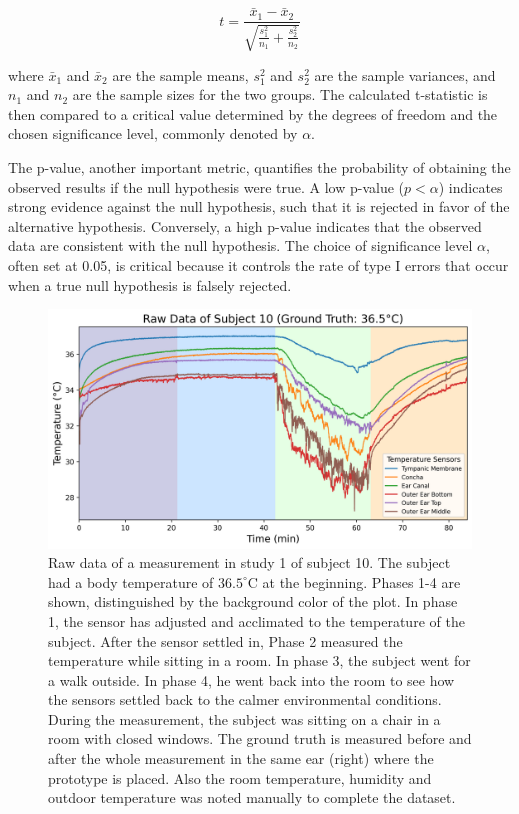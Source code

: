 \[
t = \frac{{\bar{x}_1 - \bar{x}_2}}{\sqrt{\frac{{s_1^2}}{n_1} + \frac{{s_2^2}}{n_2}}}
\]

where \( \bar{x}_1 \) and \( \bar{x}_2 \) are the sample means, \( s_1^2 \) and \( s_2^2 \) are the sample variances, and \( n_1 \) and \( n_2 \) are the sample sizes for the two groups.
The calculated t-statistic is then compared to a critical value determined by the degrees of freedom and the chosen significance level, commonly denoted by \( \alpha \).

The p-value, another important metric, quantifies the probability of obtaining the observed results if the null hypothesis were true.
A low p-value (\( p < \alpha \)) indicates strong evidence against the null hypothesis, such that it is rejected in favor of the alternative hypothesis.
Conversely, a high p-value indicates that the observed data are consistent with the null hypothesis.
The choice of significance level \( \alpha \), often set at 0.05, is critical because it controls the rate of type I errors that occur when a true null hypothesis is falsely rejected.

\begin{figure}[!t]
    \centering
    \includegraphics[width=\textwidth]{thesis-doc/images/study1/Logging_person_10_0smoothed_raw_data.png}
    \caption{Raw data of a measurement in study 1 of subject 10. The subject had a body temperature of $36.5^\circ\text{C}$ at the beginning. Phases 1-4 are shown, distinguished by the background color of the plot. In phase 1, the sensor has adjusted and acclimated to the temperature of the subject. After the sensor settled in, Phase 2 measured the temperature while sitting in a room. In phase 3, the subject went for a walk outside. In phase 4, he went back into the room to see how the sensors settled back to the calmer environmental conditions. During the measurement, the subject was sitting on a chair in a room with closed windows. The ground truth is measured before and after the whole measurement in the same ear (right) where the prototype is placed. Also the room temperature, humidity and outdoor temperature was noted manually to complete the dataset.}
    \label{fig:ch:Evaluation:Study1:RawData}
\end{figure}

